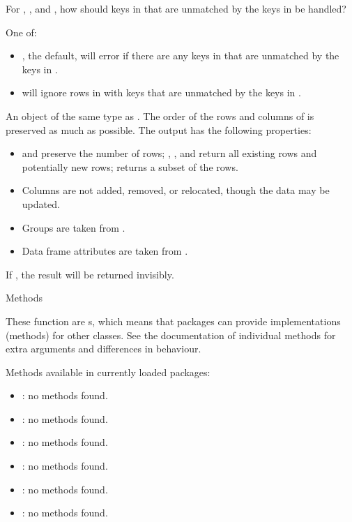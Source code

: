 \documentclass[a4paper]{book}
\begin{document}
\begin{Arguments}
\begin{ldescription}
\item[\code{unmatched}] For , , and ,
how should keys in  that are unmatched by the keys in  be handled?

One of:
\begin{itemize}

\item{} , the default, will error if there are any keys in  that
are unmatched by the keys in .
\item{}  will ignore rows in  with keys that are unmatched by the
keys in .

\end{itemize}

\end{ldescription}
\end{Arguments}
%
\begin{Value}
An object of the same type as . The order of the rows and columns of 
is preserved as much as possible. The output has the following properties:
\begin{itemize}

\item{}  and  preserve the number of rows;
, , and  return all existing
rows and potentially new rows;  returns a subset of the
rows.
\item{} Columns are not added, removed, or relocated, though the data may be
updated.
\item{} Groups are taken from .
\item{} Data frame attributes are taken from .

\end{itemize}


If , the result will be returned invisibly.
\end{Value}
%
\begin{Section}{Methods}

These function are s, which means that packages can provide
implementations (methods) for other classes. See the documentation of
individual methods for extra arguments and differences in behaviour.

Methods available in currently loaded packages:
\begin{itemize}

\item{} : no methods found.
\item{} : no methods found.
\item{} : no methods found.
\item{} : no methods found.
\item{} : no methods found.
\item{} : no methods found.

\end{itemize}

\end{Section}
\end{document}
